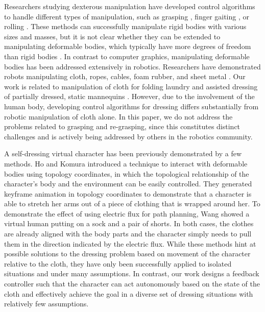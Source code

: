 Researchers studying dexterous manipulation have developed control
algorithms to handle different types of manipulation, such as grasping
\cite{Pollard:2005:PBG,Kry:2006:ICS,Wang:2013:VHM,Zhao:2013:RRP}, finger
gaiting \cite{Ye:2012:SDH}, or rolling \cite{Bai:2014:DMU}. These methods
can successfully manipulate rigid bodies with various sizes and masses,
but it is not clear whether they can be extended to manipulating
deformable bodies, which typically have more degrees of freedom than rigid
bodies \cite{Wang:2012:manipulation}. In contrast to computer graphics, manipulating deformable bodies
has been addressed extensively in robotics. Researchers have demonstrated
robots manipulating cloth, ropes, cables, foam rubber, and sheet metal
\cite{Kosuge:1995:MFO,Wu:1995:AHC,Fahantidis:1997:RHF,Osawa:2007:UML,Cusumano:2011:BCD,Bersch:2011:BRC,Miller:2012:GAR}.
Our work is related to manipulation of cloth for folding laundry
\cite{Osawa:2007:UML,Cusumano:2011:BCD,Bersch:2011:BRC,Miller:2012:GAR} and assisted dressing of partially dressed, static mannequins \cite{Tamei:2011:reinforcement}.
However, due to the involvement of the human body, developing control
algorithms for dressing differs substantially from robotic manipulation of
cloth alone. In this paper, we do not address the problems related to
grasping and re-grasping, since this constitutes distinct challenges and
is actively being addressed by others in the robotics community.



A self-dressing virtual character has been previously demonstrated by a
few methods. Ho and Komura  introduced a technique
to interact with deformable bodies using topology coordinates, in which
the topological relationship of the character's body and the environment
can be easily controlled. They generated keyframe animation in topology
coordinates to demonstrate that a character is able to stretch her arms
out of a piece of clothing that is wrapped around her. To demonstrate the
effect of using electric flux for path planning, Wang \etal
{} showed a virtual human putting on a sock and a
pair of shorts. In both cases, the clothes are already aligned with the
body parts and the character simply needs to pull them in the direction
indicated by the electric flux. While these methods hint at possible
solutions to the dressing problem based on movement of the character relative to the cloth, they have only been successfully applied to isolated situations and under many assumptions. In contrast, our
work designs a feedback controller such that the character can act
autonomously based on the state of the cloth and effectively achieve the goal in a diverse set of dressing situations with relatively few assumptions.

